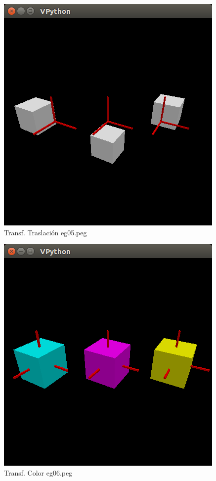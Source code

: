 \documentclass[10pt,a4paper]{article}
\begin{document}
\begin{figure}[H]
\centering
\includegraphics[scale=0.3]{eg05.png}
\caption{Transf. Traslación eg05.peg}
\end{figure}
\begin{figure}[H]
\centering
\includegraphics[scale=0.3]{eg06.png}
\caption{Transf. Color eg06.peg}
\end{figure}
\pagebreak
\end{document}
